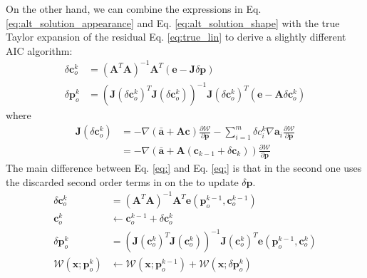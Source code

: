 On the other hand, we can combine the expressions in Eq. \ref{eq:alt_solution_appearance} and Eq. \ref{eq:alt_solution_shape} with the true Taylor expansion of the residual Eq. \ref{eq:true_lin} to derive a slightly different AIC algorithm: 
\begin{equation}
    \begin{aligned}
        \delta\mathbf{c}_o^k & = (\mathbf{A}^T\mathbf{A})^{-1} \mathbf{A}^T \left( \mathbf{e} - \mathbf{J} \delta\mathbf{p} \right) 
        \\
        \delta\mathbf{p}_o^k & = (\mathbf{J}(\delta\mathbf{c}_o^k)^T\mathbf{J}(\delta\mathbf{c}_o^k))^{-1} \mathbf{J}(\delta\mathbf{c}_o^k)^T \left( \mathbf{e} - \mathbf{A} \delta\mathbf{c}_o^k \right) 
        \label{eq:alt_solution_appearance}
    \end{aligned}
\end{equation}
where 
\begin{equation}
    \begin{aligned}
        \mathbf{J}(\delta\mathbf{c}_o^k) & = -\nabla\left(\bar{\mathbf{a}} + \mathbf{A}\mathbf{c} \right) \frac{\partial\mathcal{W}}{\partial\mathbf{p}}  -\sum_{i=1}^m \delta c_i^k \nabla \mathbf{a}_i \frac{\partial\mathcal{W}}{\partial\mathbf{p}}
        \\
        & = -\nabla\left(\bar{\mathbf{a}} + \mathbf{A}(\mathbf{c}_{k-1} + \delta\mathbf{c}_k) \right) \frac{\partial\mathcal{W}}{\partial\mathbf{p}}
        \label{eq:alt_solution_appearance}
    \end{aligned}
\end{equation}
The main difference between Eq. \ref{eq:} and Eq. \ref{eq:} is that in the second one uses the discarded second order terms in on the to update $\delta\mathbf{p}$.
\begin{equation}
    \begin{aligned}
        \delta\mathbf{c}_o^k & = (\mathbf{A}^T\mathbf{A})^{-1} \mathbf{A}^T \mathbf{e}(\mathbf{p}_o^{k-1}, \mathbf{c}_o^{k-1})
        \\
        \mathbf{c}_o^k & \leftarrow \mathbf{c}_o^{k-1} + \delta\mathbf{c}_o^k
        \\
        \delta\mathbf{p}_o^k & = (\mathbf{J}(\mathbf{c}_o^k)^T\mathbf{J}(\mathbf{c}_o^k))^{-1} \mathbf{J}(\mathbf{c}_o^k)^T \mathbf{e}(\mathbf{p}_o^{k-1}, \mathbf{c}_o^k)
        \\
        \mathcal{W}(\mathbf{x}; \mathbf{p}_o^k) & \leftarrow \mathcal{W}(\mathbf{x}; \mathbf{p}_o^{k-1}) + \mathcal{W}(\mathbf{x}; \delta\mathbf{p}_o^k)
        \label{eq:alt_solution_appearance}
    \end{aligned}
\end{equation}

